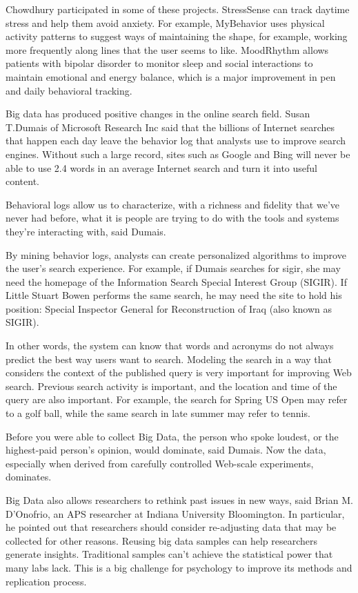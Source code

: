 Chowdhury participated in some of these projects. StressSense can track 
daytime stress and help them avoid anxiety. For example, MyBehavior uses 
physical activity patterns to suggest ways of maintaining the shape, for 
example, working more frequently along lines that the user seems to like. 
MoodRhythm allows patients with bipolar disorder to monitor sleep and social 
interactions to maintain emotional and energy balance, which is a major 
improvement in pen and daily behavioral tracking\cite{editor00}. 

Big data has produced positive changes in the online search field. 
Susan T.Dumais of Microsoft Research Inc said that the billions of 
Internet searches that happen each day leave the behavior log that 
analysts use to improve search engines. Without such a large record, 
sites such as Google and Bing will never be able to use 2.4 words in 
an average Internet search and turn it into useful 
content\cite{editor00}.

Behavioral logs allow us to characterize, with a richness and fidelity 
that we’ve never had before, what it is people are trying to do with
the tools and systems they’re interacting with, said Dumais\cite{editor00}.

By mining behavior logs, analysts can create personalized algorithms 
to improve the user's search experience. For example, if Dumais searches 
for sigir, she may need the homepage of the Information Search Special 
Interest Group (SIGIR). If Little Stuart Bowen performs the same search, 
he may need the site to hold his position: Special Inspector General 
for Reconstruction of Iraq (also known as SIGIR).

In other words, the system can know that words and acronyms do not always 
predict the best way users want to search. Modeling the search in a way 
that considers the context of the published query is very important for 
improving Web search. Previous search activity is important, and the 
location and time of the query are also important. For example, the 
search for Spring US Open may refer to a golf ball, while the same 
search in late summer may refer to tennis.

Before you were able to collect Big Data, the person who spoke loudest, 
or the highest-paid person’s opinion, would dominate, said Dumais. Now 
the data, especially when derived from carefully controlled Web-scale 
experiments, dominates.\cite{editor00}

Big Data also allows researchers to rethink past issues in new ways, 
said Brian M. D'Onofrio, an APS researcher at Indiana University Bloomington. 
In particular, he pointed out that researchers should consider re-adjusting 
data that may be collected for other reasons. Reusing big data samples can 
help researchers generate insights. Traditional samples can't achieve the 
statistical power that many labs lack. This is a big challenge for psychology 
to improve its methods and replication process.

